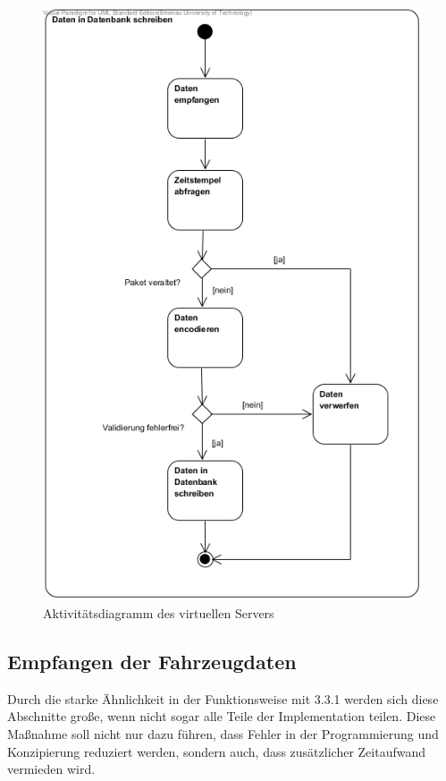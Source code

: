 \documentclass[fontsize = 12pt, paper = a4]{scrreprt}
\begin{document}
\begin{figure}[h]
\centering
\includegraphics[scale = 0.70]{activity_vserver.png}
\caption[Aktivitätsdiagramm vServer]{Aktivitätsdiagramm des virtuellen Servers}
\end{figure}

\newpage


\subsection{Empfangen der Fahrzeugdaten}

Durch die starke Ähnlichkeit in der Funktionsweise mit 3.3.1 werden sich diese Abschnitte große, wenn nicht sogar alle Teile der Implementation teilen. Diese Maßnahme soll nicht nur dazu führen, dass Fehler in der Programmierung und Konzipierung reduziert werden, sondern auch, dass zusätzlicher Zeitaufwand vermieden wird. 
\end{document}
